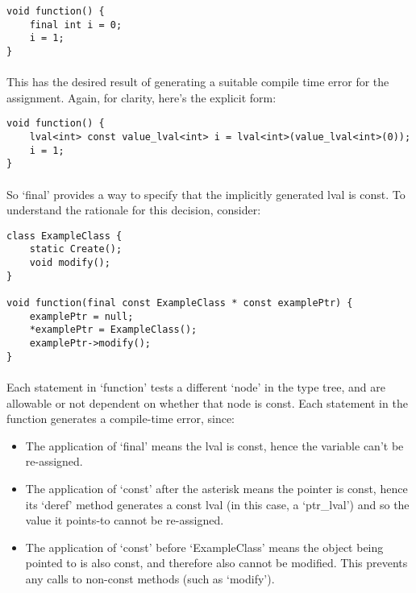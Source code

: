 \documentclass[12pt,twoside,notitlepage]{report}
\begin{document}
\begin{lstlisting}
void function() {
	final int i = 0;
	i = 1;
}
\end{lstlisting}

\paragraph{}
This has the desired result of generating a suitable compile time error for the assignment. Again, for clarity, here's the explicit form:

\begin{lstlisting}
void function() {
	lval<int> const value_lval<int> i = lval<int>(value_lval<int>(0));
	i = 1;
}
\end{lstlisting}

\paragraph{}
So `final' provides a way to specify that the implicitly generated lval is const. To understand the rationale for this decision, consider:

\begin{lstlisting}
class ExampleClass {
	static Create();
	void modify();
}

void function(final const ExampleClass * const examplePtr) {
	examplePtr = null;
	*examplePtr = ExampleClass();
	examplePtr->modify();
}
\end{lstlisting}

\paragraph{}
Each statement in `function' tests a different `node' in the type tree, and are allowable or not dependent on whether that node is const. Each statement in the function generates a compile-time error, since:

\begin{itemize}
\item The application of `final' means the lval is const, hence the variable can't be re-assigned.
\item The application of `const' after the asterisk means the pointer is const, hence its `deref' method generates a const lval (in this case, a `ptr\_lval') and so the value it points-to cannot be re-assigned.
\item The application of `const' before `ExampleClass' means the object being pointed to is also const, and therefore also cannot be modified. This prevents any calls to non-const methods (such as `modify').
\end{itemize}
\end{document}
